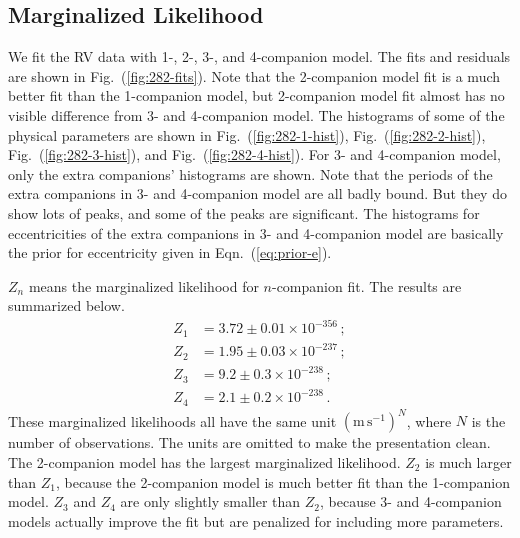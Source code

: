 \documentclass[letterpaper, preprint]{aastex}
\newcommand{\unit}[1]{\mathrm{#1}}
\begin{document}
\subsection{Marginalized Likelihood}
We fit the RV data with 1-, 2-, 3-, and 4-companion model. The fits and residuals are shown in Fig.~(\ref{fig:282-fits}). Note that the 2-companion model fit is a much better fit than the 1-companion model, but 2-companion model fit almost has no visible difference from 3- and 4-companion model. The histograms of some of the physical parameters are shown in Fig.~(\ref{fig:282-1-hist}), Fig.~(\ref{fig:282-2-hist}), Fig.~(\ref{fig:282-3-hist}), and Fig.~(\ref{fig:282-4-hist}). For 3- and 4-companion model, only the extra companions' histograms are shown. Note that the periods of the extra companions in 3- and 4-companion model are all badly bound. But they do show lots of peaks, and some of the peaks are significant. The histograms for eccentricities of the extra companions in 3- and 4-companion model are basically the prior for eccentricity given in Eqn.~(\ref{eq:prior-e}).

$Z_n$ means the marginalized likelihood for $n$-companion fit. The results are summarized below. 
\begin{align}
Z_1 &= 3.72 \pm 0.01 \times 10^{-356}\, ;\nonumber\\ 
Z_2 &= 1.95 \pm 0.03 \times 10^{-237}\, ;\nonumber\\
Z_3 &= 9.2 \pm 0.3 \times 10^{-238}\,;\nonumber \\
Z_4 &= 2.1 \pm 0.2 \times 10^{-238}\, .
\label{eq:Z-282}
\end{align}
These marginalized likelihoods all have the same unit $\left( \unit{m\,s^{-1}} \right)^N$, where $N$ is the number of observations. The units are omitted to make the presentation clean. The 2-companion model has the largest marginalized likelihood. $Z_2$ is much larger than $Z_1$, because the 2-companion model is much better fit than the 1-companion model. $Z_3$ and $Z_4$ are only slightly smaller than $Z_2$, because 3- and 4-companion models actually improve the fit but are penalized for including more parameters. 
\end{document}
